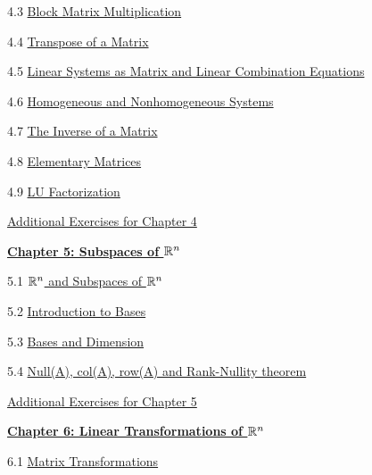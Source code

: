\documentclass{ximera}
\begin{document}
4.3	\href{https://ximera.osu.edu/linearalgebradzv3/LinearAlgebraInteractiveIntro/MAT-0023/main}{Block Matrix Multiplication}
	
4.4	\href{https://ximera.osu.edu/linearalgebradzv3/LinearAlgebraInteractiveIntro/MAT-0025/main}{Transpose of a Matrix}
	
4.5	\href{https://ximera.osu.edu/linearalgebradzv3/LinearAlgebraInteractiveIntro/MAT-0030/main}{Linear Systems as Matrix and Linear Combination Equations}
	
4.6	\href{https://ximera.osu.edu/linearalgebradzv3/LinearAlgebraInteractiveIntro/SYS-0050/main}{Homogeneous and Nonhomogeneous Systems}

4.7	\href{https://ximera.osu.edu/linearalgebradzv3/LinearAlgebraInteractiveIntro/MAT-0050/main}{The Inverse of a Matrix}
	
4.8	\href{https://ximera.osu.edu/linearalgebradzv3/LinearAlgebraInteractiveIntro/MAT-0060/main}{Elementary Matrices}
	
4.9	\href{https://ximera.osu.edu/linearalgebradzv3/LinearAlgebraInteractiveIntro/MAT-0070/main}{LU Factorization}
	
\href{https://ximera.osu.edu/linearalgebradzv3/LinearAlgebraInteractiveIntro/SUPX-0040/main}{Additional Exercises for Chapter 4}
	
\href{https://ximera.osu.edu/linearalgebradzv3/LinearAlgebraInteractiveIntro/XLAChapter_subspacesRn/main}{\textbf{Chapter 5: Subspaces of $\mathbb{R}^n$}}
	
5.1	\href{https://ximera.osu.edu/linearalgebradzv3/LinearAlgebraInteractiveIntro/VSP-0020/main}{$\mathbb{R}^n$ and Subspaces of $\mathbb{R}^n$}
	
5.2	\href{https://ximera.osu.edu/linearalgebradzv3/LinearAlgebraInteractiveIntro/VSP-0030/main}{Introduction to Bases}
	
5.3	\href{https://ximera.osu.edu/linearalgebradzv3/LinearAlgebraInteractiveIntro/VSP-0035/main}{Bases and Dimension}
	
5.4	\href{https://ximera.osu.edu/linearalgebradzv3/LinearAlgebraInteractiveIntro/VSP-0040/main}{Null(A), col(A), row(A) and Rank-Nullity theorem}
	
\href{https://ximera.osu.edu/linearalgebradzv3/LinearAlgebraInteractiveIntro/SUPX-0050/main}{Additional Exercises for Chapter 5}
	
\href{https://ximera.osu.edu/linearalgebradzv3/LinearAlgebraInteractiveIntro/XLAChapter_linTrans/main}{\textbf{Chapter 6: Linear Transformations of $\mathbb{R}^n$}}
	
6.1	\href{https://ximera.osu.edu/linearalgebradzv3/LinearAlgebraInteractiveIntro/LTR-0005/main}{Matrix Transformations}
	
\end{document}
